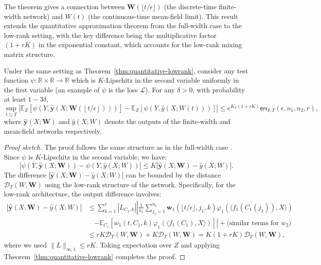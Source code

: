 The theorem gives a connection between $\mathbf{W}(\lfloor t/\epsilon\rfloor)$ (the discrete-time finite-width network) and $W(t)$ (the continuous-time mean-field limit). This result extends the quantitative approximation theorem from the full-width case \cite{nguyen2020global} to the low-rank setting, with the key difference being the multiplicative factor $(1+rK)$ in the exponential constant, which accounts for the low-rank mixing matrix structure.

\begin{corollary}
\label{cor:gradient-descent-quality-lowrank}
Under the same setting as Theorem~\ref{thm:quantitative-lowrank}, consider any test function $\psi:\mathbb{R}\times\mathbb{R}\to\mathbb{R}$ which is $K$-Lipschitz in the second variable uniformly in the first variable (an example of $\psi$ is the loss $\mathscr{L}$). For any $\delta>0$, with probability at least $1-3\delta$,
\[
\sup_{t\leq T}\left|\mathbb{E}_{Z}\left[\psi\left(Y,\hat{\mathbf{y}}\left(X;\mathbf{W}\left(\left\lfloor t/\epsilon\right\rfloor \right)\right)\right)\right]-\mathbb{E}_{Z}\left[\psi\left(Y,\hat{y}\left(X;W\left(t\right)\right)\right)\right]\right|\leq e^{K_T(1+rK)}\mathsf{err}_{\delta,T}\left(\epsilon,n_{1},n_{2},r\right),
\]
where $\hat{\mathbf{y}}(X; \mathbf{W})$ and $\hat{y}(X; W)$ denote the outputs of the finite-width and mean-field networks respectively.
\end{corollary}

\begin{proof}[Proof sketch]
The proof follows the same structure as in the full-width case \cite{nguyen2020global}. Since $\psi$ is $K$-Lipschitz in the second variable, we have:
\[
|\psi(Y, \hat{\mathbf{y}}(X; \mathbf{W})) - \psi(Y, \hat{y}(X; W))| \le K|\hat{\mathbf{y}}(X; \mathbf{W}) - \hat{y}(X; W)|.
\]
The difference $|\hat{\mathbf{y}}(X; \mathbf{W}) - \hat{y}(X; W)|$ can be bounded by the distance $\mathscr{D}_T(W, \mathbf{W})$ using the low-rank structure of the network. Specifically, for the low-rank architecture, the output difference involves:
\begin{align*}
|\hat{\mathbf{y}}(X; \mathbf{W}) - \hat{y}(X; W)| &\le \sum_{k=1}^r |L_{C_2,k}|\left|\frac{1}{n_1}\sum_{j_1=1}^{n_1}\mathbf{w}_1(\lfloor t/\epsilon\rfloor, j_1, k)\varphi_1(\langle f_1(C_1(j_1)), X\rangle)\right.\\
&\quad\left. - \mathbb{E}_{C_1}[w_1(t, C_1, k)\varphi_1(\langle f_1(C_1), X\rangle)]\right| + \text{(similar terms for $w_2$)}\\
&\le rK\mathscr{D}_T(W, \mathbf{W}) + K\mathscr{D}_T(W, \mathbf{W}) = K(1+rK)\mathscr{D}_T(W, \mathbf{W}),
\end{align*}
where we used $\|L\|_{\infty,1} \le rK$. Taking expectation over $Z$ and applying Theorem~\ref{thm:quantitative-lowrank} completes the proof.
\end{proof}

